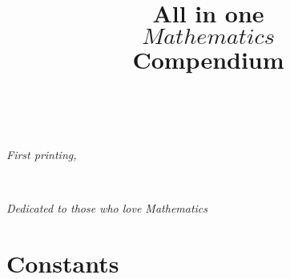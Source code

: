 \documentclass{tufte-book}
\title[All in one Mathematics Compendium]{All in one\\$Mathematics$\\\quad Compendium}
\begin{document}
\frontmatter

\maketitle

\newpage

\begin{fullwidth}
~\vfill
\thispagestyle{empty}
\setlength{\parindent}{0pt}
\setlength{\parskip}{\baselineskip}


\par{}

\par\textit{First printing, \monthyear}
\end{fullwidth}

\tableofcontents

\listoffigures
\listoftables


\cleardoublepage
~\vfill
\begin{doublespace}
\noindent\fontsize{18}{22}\selectfont\itshape
\nohyphenation
Dedicated to those who love Mathematics
\end{doublespace}
\vfill
\vfill

\cleardoublepage

\chapter{Constants}
\end{document}
